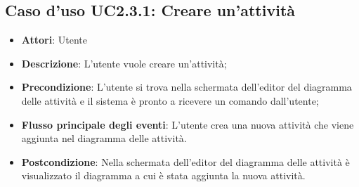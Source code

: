 \documentclass[../AnalisiDeiRequisiti.tex]{subfiles}
\begin{document}
				\subsection{Caso d'uso UC2.3.1: Creare un'attività}
				\begin{itemize}
					\item \textbf{Attori}: Utente
					\item \textbf{Descrizione}: L'utente vuole creare un'attività;
					\item \textbf{Precondizione}: L'utente si trova nella schermata dell'editor del diagramma delle attività e il sistema è pronto a ricevere un comando dall'utente;
					\item \textbf{Flusso principale degli eventi}: L'utente crea una nuova attività che viene aggiunta nel diagramma delle attività.
					\item \textbf{Postcondizione}: Nella schermata dell'editor del diagramma delle attività è visualizzato il diagramma a cui è stata aggiunta la nuova attività.
				\end{itemize}
\end{document}
